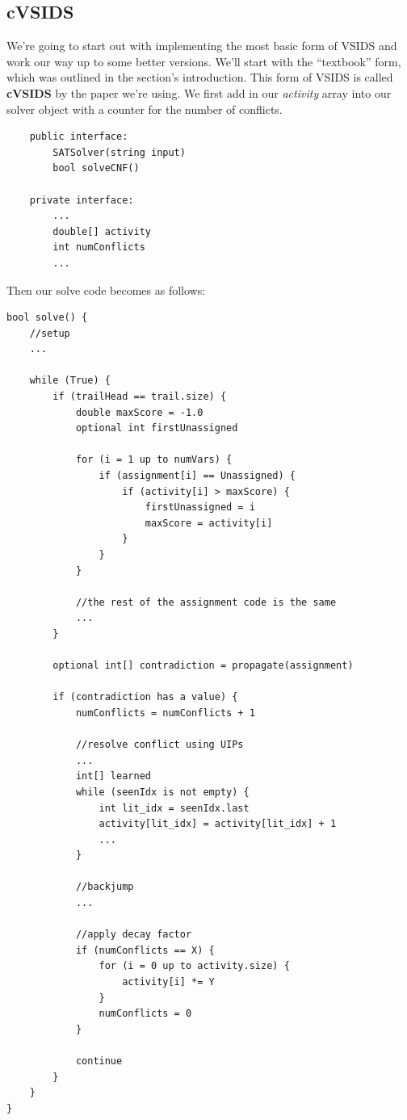 \documentclass[oneside]{book}
\begin{document}
\subsection{cVSIDS}

We're going to start out with implementing the most basic form of VSIDS and work our way 
up to some better versions. We'll start with the ``textbook'' form, which was outlined in 
the section's introduction. This form of VSIDS is called \textbf{cVSIDS} by the paper we're 
using. We first add in our \textit{activity} array into our solver 
object with a counter for the number of conflicts.
\begin{lstlisting}
    public interface:
        SATSolver(string input)
        bool solveCNF()

    private interface:
        ...
        double[] activity
        int numConflicts
        ...
\end{lstlisting}
Then our solve code becomes as follows:
\begin{lstlisting}
bool solve() {
    //setup
    ...

    while (True) {
        if (trailHead == trail.size) {
            double maxScore = -1.0
            optional int firstUnassigned

            for (i = 1 up to numVars) {
                if (assignment[i] == Unassigned) {
                    if (activity[i] > maxScore) {
                        firstUnassigned = i
                        maxScore = activity[i]
                    }
                }
            }  
            
            //the rest of the assignment code is the same
            ...
        }

        optional int[] contradiction = propagate(assignment)

        if (contradiction has a value) {
            numConflicts = numConflicts + 1

            //resolve conflict using UIPs
            ...
            int[] learned
            while (seenIdx is not empty) {
                int lit_idx = seenIdx.last
                activity[lit_idx] = activity[lit_idx] + 1
                ...
            }

            //backjump
            ...

            //apply decay factor
            if (numConflicts == X) {
                for (i = 0 up to activity.size) {
                    activity[i] *= Y
                }
                numConflicts = 0
            }

            continue
        }
    }
}
\end{lstlisting}
\end{document}
